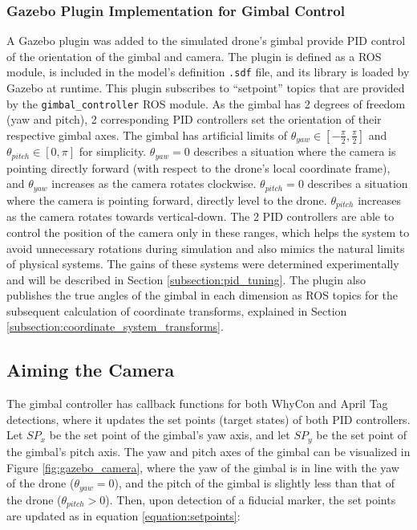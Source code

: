 \subsubsection{Gazebo Plugin Implementation for Gimbal Control}

A Gazebo plugin was added to the simulated drone's gimbal provide \gls{PID} control of the orientation of the gimbal and camera. The plugin is defined as a ROS module, is included in the model's definition \texttt{.sdf} file, and its library is loaded by Gazebo at runtime. This plugin subscribes to ``setpoint'' topics that are provided by the \texttt{gimbal\_controller} ROS module. As the gimbal has 2 degrees of freedom (yaw and pitch), 2 corresponding \gls{PID} controllers set the orientation of their respective gimbal axes. The gimbal has artificial limits of $\theta_{yaw} \in \left[ -\frac{\pi}{2}, \frac{\pi}{2} \right]$ and $\theta_{pitch} \in [0, \pi]$ for simplicity. $\theta_{yaw} = 0$ describes a situation where the camera is pointing directly forward (with respect to the drone's local coordinate frame), and $\theta_{yaw}$ increases as the camera rotates clockwise. $\theta_{pitch} = 0$ describes a situation where the camera is pointing forward, directly level to the drone. $\theta_{pitch}$ increases as the camera rotates towards vertical-down. The 2 \gls{PID} controllers are able to control the position of the camera only in these ranges, which helps the system to avoid unnecessary rotations during simulation and also mimics the natural limits of physical systems. The gains of these systems were determined experimentally and will be described in Section \ref{subsection:pid_tuning}. The plugin also publishes the true angles of the gimbal in each dimension as ROS topics for the subsequent calculation of coordinate transforms, explained in Section \ref{subsection:coordinate_system_transforms}.

\subsection{Aiming the Camera}
\label{subsection:aiming_the_camera}

The gimbal controller has callback functions for both WhyCon and April Tag detections, where it updates the set points (target states) of both \gls{PID} controllers. Let $SP_x$ be the set point of the gimbal's yaw axis, and let $SP_y$ be the set point of the gimbal's pitch axis. The yaw and pitch axes of the gimbal can be visualized in Figure \ref{fig:gazebo_camera}, where the yaw of the gimbal is in line with the yaw of the drone ($\theta_{yaw}=0$), and the pitch of the gimbal is slightly less than that of the drone ($\theta_{pitch} > 0$). Then, upon detection of a fiducial marker, the set points are updated as in equation \ref{equation:setpoints}:

